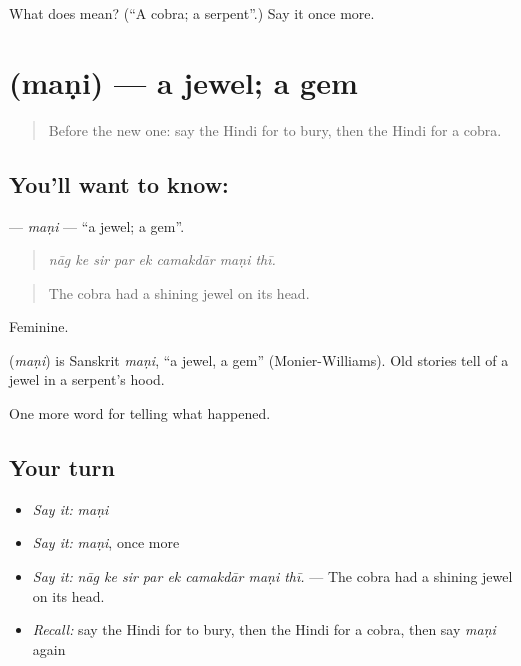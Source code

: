 \begin{tcolorbox}[breakable,colback=teal!4,colframe=teal!35!black,title={Before you move on}]
What does  mean? (\textquotedblleft{}A cobra; a serpent\textquotedblright{}.) Say it once more.
\end{tcolorbox}
\section[\texorpdfstring{\hi{मणि} (maṇi)}{मणि (maṇi)}]{ (maṇi) — a jewel; a gem}

\label{lesson:HI-C337-mani}



\begin{quote}
Before the new one: say the Hindi for to bury, then the Hindi for a cobra.
\end{quote}

\subsection*{You'll want to know: }
\textbf{} — \emph{maṇi} — \textquotedblleft{}a jewel; a gem\textquotedblright{}.

\begin{quote}
       
\end{quote}

\begin{quote}
\emph{nāg ke sir par ek camakdār maṇi thī.}
\end{quote}

\begin{quote}
The cobra had a shining jewel on its head.
\end{quote}

Feminine.

\begin{cousinweb}
\textbf{} (\emph{maṇi}) is Sanskrit \emph{maṇi}, \textquotedblleft{}a jewel, a gem\textquotedblright{} (Monier-Williams). Old stories tell of a jewel in a serpent's hood.
\end{cousinweb}

\begin{grammarlens}[title={What you've built}]
One more word for telling what happened.
\end{grammarlens}

\subsection*{Your turn}
\begin{itemize}
\raggedright
  \item \emph{Say it:} \emph{maṇi}
  \item \emph{Say it:} \emph{maṇi}, once more
  \item \emph{Say it:} \emph{nāg ke sir par ek camakdār maṇi thī.} — The cobra had a shining jewel on its head.
  \item \emph{Recall:} say the Hindi for to bury, then the Hindi for a cobra, then say \emph{maṇi} again
\end{itemize}

